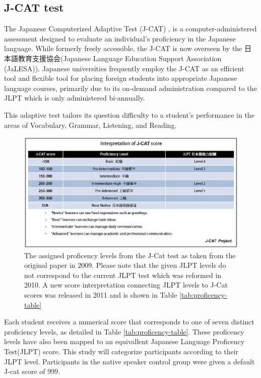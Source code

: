 \subsection{J-CAT test}
\label{j-cat}


The Japanese Computerized Adaptive Test (J-CAT) \citep{Imai2009}, is a computer-administered assessment
designed to evaluate an
individual's proficiency in the Japanese language. While formerly freely accessible, the J-CAT is now overseen by
the  日本語教育支援協会(Japanese Language Education Support Association (JaLESA)). Japanese
universities frequently
employ the J-CAT as an efficient tool and flexible tool for placing foreign students into appropriate Japanese
language courses, primarily due to its on-demand administration compared to the JLPT which is only
administered bi-annually.

This adaptive test tailors its
question difficulty to a
student's performance in
the areas of Vocabulary, Grammar, Listening, and Reading.

\begin{figure}[h]
    \centering
    \includegraphics[scale=.3]{img/JCatScores.png}
    \caption[J-Cat Proficency Levels]{The assigned proficency levels from the J-Cat test as taken from the original paper in  2009. Please note that the given JLPT levels do not correspond to the current JLPT test which was reformed in 2010. A new score interpretation connecting JLPT levels to J-Cat scores was released in 2011 and is shown in Table \ref{tab:proficency-table} }
    \label{fig:JCatLevels}
\end{figure}

Each student receives a numerical score that corresponds to one of seven distinct proficiency levels, as detailed in
Table \ref{tab:proficency-table}. These proficency levels have also been mapped to an equivallent Japanese Language
Proficency
Test(JLPT) score.
This study will categorize
participants according to their JLPT level. Participants in the
native speaker control group were given a default J-cat score of 999.

